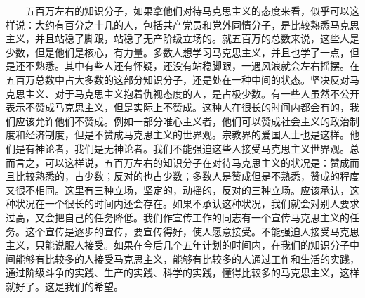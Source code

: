 \documentclass[cn,11pt,chinese]{elegantbook}
\begin{document}
　　五百万左右的知识分子，如果拿他们对待马克思主义的态度来看，似乎可以这样说：大约有百分之十几的人，包括共产党员和党外同情分子，是比较熟悉马克思主义，并且站稳了脚跟，站稳了无产阶级立场的。就五百万的总数来说，这些人是少数，但是他们是核心，有力量。多数人想学习马克思主义，并且也学了一点，但是还不熟悉。其中有些人还有怀疑，还没有站稳脚跟，一遇风浪就会左右摇摆。在五百万总数中占大多数的这部分知识分子，还是处在一种中间的状态。坚决反对马克思主义、对于马克思主义抱着仇视态度的人，是占极少数。有一些人虽然不公开表示不赞成马克思主义，但是实际上不赞成。这种人在很长的时间内都会有的，我们应该允许他们不赞成。例如一部分唯心主义者，他们可以赞成社会主义的政治制度和经济制度，但是不赞成马克思主义的世界观。宗教界的爱国人士也是这样。他们是有神论者，我们是无神论者。我们不能强迫这些人接受马克思主义世界观。总而言之，可以这样说，五百万左右的知识分子在对待马克思主义的状况是：赞成而且比较熟悉的，占少数；反对的也占少数；多数人是赞成但是不熟悉，赞成的程度又很不相同。这里有三种立场，坚定的，动摇的，反对的三种立场。应该承认，这种状况在一个很长的时间内还会存在。如果不承认这种状况，我们就会对别人要求过高，又会把自己的任务降低。我们作宣传工作的同志有一个宣传马克思主义的任务。这个宣传是逐步的宣传，要宣传得好，使人愿意接受。不能强迫人接受马克思主义，只能说服人接受。如果在今后几个五年计划的时间内，在我们的知识分子中间能够有比较多的人接受马克思主义，能够有比较多的人通过工作和生活的实践，通过阶级斗争的实践、生产的实践、科学的实践，懂得比较多的马克思主义，这样就好了。这是我们的希望。\\
\end{document}
